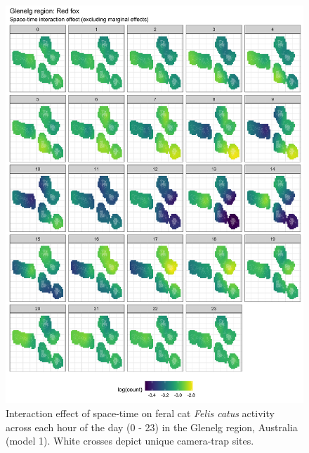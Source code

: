 \documentclass[11pt,a4paper,titlepage,twoside,openright]{style/unimelbthesis}
\begin{document}
\begin{mainmatter}
\begin{figure}
{\centering \includegraphics[width=1\linewidth]{figure/spte_diff_avg_g_fox} 

}

\caption{Interaction effect of space-time on feral cat \textit{Felis catus} activity across each hour of the day (0 - 23) in the Glenelg region, Australia (model 1). White crosses depict unique camera-trap sites. }\label{fig:diel-st-int-g-fox}
\end{figure}
\newpage
\begin{figure}


\end{figure}
\end{mainmatter}
\end{document}
